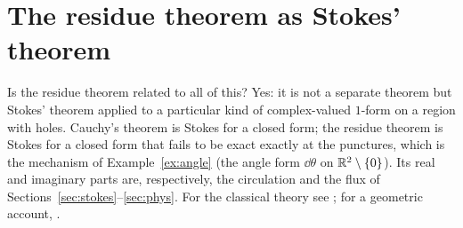 \section{The residue theorem as Stokes' theorem}\label{sec:complex}

Is the residue theorem related to all of this? Yes: it is not a separate theorem but Stokes' theorem applied to a particular kind of complex-valued $1$-form on a region with holes.
Cauchy's theorem is Stokes for a closed form; the residue theorem is Stokes for a closed form that fails to be exact exactly at the punctures, which is the mechanism of Example~\ref{ex:angle}
(the angle form $\dd\theta$ on $\mathbb{R}^2\setminus\{0\}$). Its real and imaginary parts are, respectively, the circulation and the flux of Sections~\ref{sec:stokes}--\ref{sec:phys}. For the classical theory see \cite{Ahlfors}; for a geometric account, \cite{Needham}.








